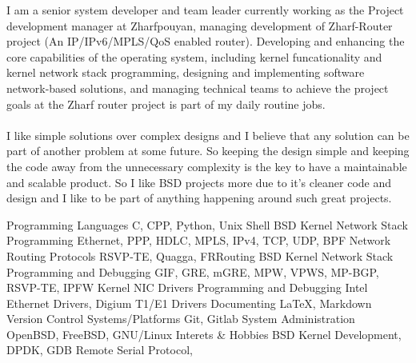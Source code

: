\documentclass[12pt]{developercv}
\begin{document}
\begin{minipage}[t]{1\textwidth}
I am a senior system developer and team leader currently working
as the Project development manager at Zharfpouyan, managing development
of Zharf-Router project (An IP/IPv6/MPLS/QoS enabled router).
Developing and enhancing the core capabilities of the operating system,
including kernel funcationality and kernel network stack programming,
designing and implementing software network-based solutions, and managing
technical teams to achieve the project goals at the Zharf router project is
part of my daily routine jobs.
\\
\\
I like simple solutions over complex designs and I believe that any solution
can be part of another problem at some future. So keeping the design simple and
keeping the code away from the unnecessary complexity is the key to have a
maintainable and scalable product. So I like BSD projects more due to it's cleaner
code and design and I like to be part of anything happening around such great projects.

\end{minipage}
\hfill %
%

\begin{entrylist}
	\entry
		{}
		{Programming Languages}
		{}
		{C, CPP, Python, Unix Shell}
	\entry
		{}
		{BSD Kernel Network Stack Programming}
		{}
		{Ethernet, PPP, HDLC, MPLS, IPv4, TCP, UDP, BPF}
	\entry
		{}
		{Network Routing Protocols}
		{}
		{RSVP-TE, Quagga, FRRouting}
	\entry
		{}
		{BSD Kernel Network Stack Programming and Debugging}
		{}
		{GIF, GRE, mGRE, MPW, VPWS, MP-BGP, RSVP-TE, IPFW}
	\entry
		{}
		{Kernel NIC Drivers Programming and Debugging}
		{}
		{Intel Ethernet Drivers, Digium T1/E1 Drivers} %
	\entry
		{}
		{Documenting}
		{}
		{\LaTeX, Markdown}
	\entry
		{}
		{Version Control Systems/Platforms}
		{}
		{Git, Gitlab}
	\entry
		{}
		{System Administration}
		{}
		{OpenBSD, FreeBSD, GNU/Linux}
	\entry
		{}
		{Interets \& Hobbies}
		{}
		{BSD Kernel Development, DPDK, GDB Remote Serial Protocol, }
\end{entrylist}
\end{document}
